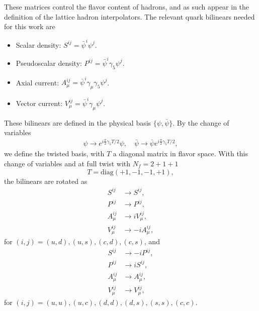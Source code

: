 These matrices control the flavor content of hadrons, and as such appear in the definition of the lattice hadron interpolators. The relevant quark bilinears needed for this work are
\begin{itemize}
\item Scalar density: $S^{ij}=\bar{\psi}^i\psi^j$.
\item Pseudoscalar density: $P^{ij}=\bar{\psi}^i\gamma_5\psi^j$.
\item Axial current: $A_{\mu}^{ij}=\bar{\psi}^i\gamma_{\mu}\gamma_5\psi^j$.
\item Vector current: $V_{\mu}^{ij}=\bar{\psi}^i\gamma_{\mu}\psi^j$.
\end{itemize}
These bilinears are defined in the physical basis $\{\psi,\bar{\psi}\}$. By the change of variables
\begin{gather}
\psi\rightarrow e^{i\frac{\pi}{2}\gamma_5T/2}\psi, \quad \bar{\psi}\rightarrow\bar{\psi}e^{i\frac{\pi}{2}\gamma_5T/2},
\end{gather}
we define the twisted basis, with $T$ a diagonal matrix in flavor space. With this change of variables and at full twist with $N_f=2+1+1$
\begin{equation}
T=\textrm{diag}(+1,-1,-1,+1),
\end{equation}
the bilinears are rotated as 
\begin{align}
S^{ij}&\rightarrow S^{ij}, \\
P^{ij}&\rightarrow P^{ij}, \\
A_{\mu}^{ij}&\rightarrow iV_{\mu}^{ij}, \\
V_{\mu}^{ij}&\rightarrow -iA_{\mu}^{ij},
\end{align}
for $(i,j)=(u,d),(u,s),(c,d),(c,s)$, and
\begin{align}
S^{ij}&\rightarrow -iP^{ij}, \\
P^{ij}&\rightarrow iS^{ij}, \\
A_{\mu}^{ij}&\rightarrow A_{\mu}^{ij}, \\
V_{\mu}^{ij}&\rightarrow V_{\mu}^{ij},
\end{align}
for $(i,j)=(u,u),(u,c),(d,d),(d,s),(s,s),(c,c)$.


